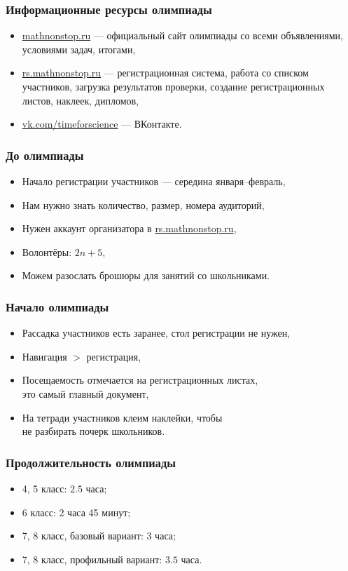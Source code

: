 \documentclass[aspectratio=1610,12pt,notheorems]{beamer}
\begin{document}
\begin{frame} \frametitle{Информационные ресурсы олимпиады}
\begin{itemize}
	\item \url{mathnonstop.ru} — официальный сайт олимпиады со всеми объявлениями, условиями задач, итогами, \medskip
	\item \url{rs.mathnonstop.ru} — регистрационная система, работа со списком участников, загрузка результатов проверки, создание регистрационных листов, наклеек, дипломов, \medskip
	\item \url{vk.com/timeforscience} — ВКонтакте.\medskip
\end{itemize}
\end{frame}

\begin{frame} \frametitle{До олимпиады}
\begin{itemize}
	\item Начало регистрации участников — середина января–февраль, \medskip
	\item Нам нужно знать количество, размер, номера аудиторий, \medskip
	\item Нужен аккаунт организатора в \url{rs.mathnonstop.ru}, \medskip
	\item Волонтёры: $2n+5$, \medskip
	\item Можем разослать брошюры для занятий со школьниками. \medskip
\end{itemize}
\end{frame}

\begin{frame} \frametitle{Начало олимпиады}
\begin{itemize}
	\item Рассадка участников есть заранее, стол регистрации не нужен, \medskip
	\item Навигация $>$ регистрация, \medskip
	\item Посещаемость отмечается на регистрационных листах, \\ это самый главный документ, \medskip
	\item На тетради участников клеим наклейки, чтобы \\ не разбирать почерк школьников. \medskip
\end{itemize}
\end{frame}

\begin{frame} \frametitle{Продолжительность олимпиады}
\begin{itemize}
\item 4, 5 класс: $2.5$ часа; \medskip
\item 6 класс: 2 часа 45 минут; \medskip
\item 7, 8 класс, базовый вариант: 3 часа; \medskip
\item 7, 8 класс, профильный вариант: $3.5$ часа.
\end{itemize}
\end{frame}
\end{document}

